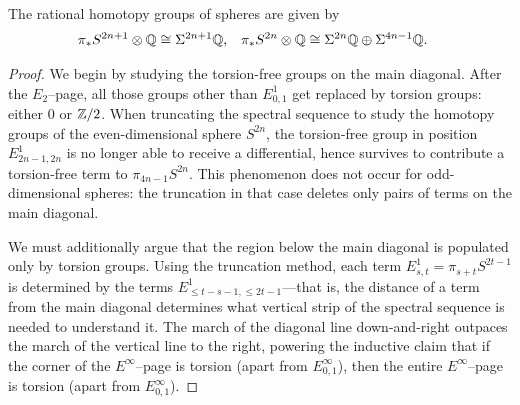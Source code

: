 \begin{corollary}
The rational homotopy groups of spheres are given by
\begin{align*}
\pi_* S^{2n+1} \otimes \mathbb Q & \cong \Sigma^{2n+1} \mathbb Q, &
\pi_* S^{2n} \otimes \mathbb Q & \cong \Sigma^{2n} \mathbb Q \oplus \Sigma^{4n-1} \mathbb Q.
\end{align*}
\end{corollary}
\begin{proof}
We begin by studying the torsion-free groups on the main diagonal.
After the $E_2$--page, all those groups other than $E^1_{0,1}$ get replaced by torsion groups: either $0$ or $\mathbb Z/2$.
When truncating the spectral sequence to study the homotopy groups of the even-dimensional sphere $S^{2n}$, the torsion-free group in position $E^1_{2n-1, 2n}$ is no longer able to receive a differential, hence survives to contribute a torsion-free term to $\pi_{4n-1} S^{2n}$.
This phenomenon does not occur for odd-dimensional spheres: the truncation in that case deletes only pairs of terms on the main diagonal.

We must additionally argue that the region below the main diagonal is populated only by torsion groups.
Using the truncation method, each term $E^1_{s, t} = \pi_{s+t} S^{2t-1}$ is determined by the terms $E^1_{\le t-s-1, \le 2t-1}$---that is, the distance of a term from the main diagonal determines what vertical strip of the spectral sequence is needed to understand it.
The march of the diagonal line down-and-right outpaces the march of the vertical line to the right, powering the inductive claim that if the corner of the $E^\infty$--page is torsion (apart from $E^\infty_{0,1}$), then the entire $E^\infty$--page is torsion (apart from $E^\infty_{0,1}$).
\end{proof}

